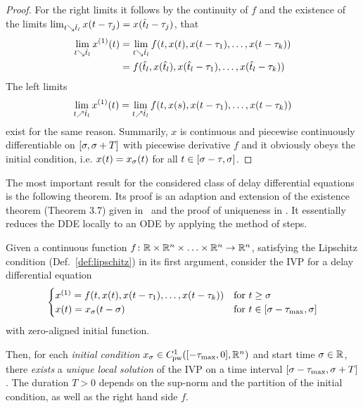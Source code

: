 \begin{proof}
        For the right limits it follows by the continuity of $f$ and the existence of the limits $\lim_{t\searrow\hat{t}_l} x(t-\tau_j) = x(\hat{t}_l-\tau_j)$, that
        \begin{align*}
            \lim_{t\downto\hat{t}_l} \D{x}(t)
            &= \lim_{t\downto\hat{t}_l} f(t,x(t),x(t-\tau_1),\ldots,x(t-\tau_k))\\
            &= f(\hat{t}_l,x(\hat{t}_l),x(\hat{t}_l-\tau_1),\ldots,x(\hat{t}_l-\tau_k))
        \end{align*}
        The left limits
        \begin{equation*}
            \lim_{t\upto\hat{t}_l} \D{x}(t) = \lim_{t\upto\hat{t}_l} f(t,x(s),x(t-\tau_1),\ldots,x(t-\tau_k)) 
        \end{equation*}
        exist for the same reason.
        Summarily, $x$ is continuous and piecewise continuously differentiable on $[\sigma,\sigma+T]$ with piecewise derivative $f$ and it obviously obeys the initial condition, i.e. $x(t)=x_{\sigma}(t)$ for all $t\in[\sigma-\tau,\sigma]$.
    \end{proof}

    The most important result for the considered class of delay differential equations is the following theorem.
    Its proof is an adaption and extension of the existence theorem (Theorem 3.7) given in~\cite{Smith10IntroDDE} and the proof of uniqueness in \cite{PruessWilke10GewDiffGl}. It essentially reduces the DDE locally to an ODE by applying the method of steps.

    \begin{theorem}
        \label{thm:solution-existence}
        Given a continuous function $f\colon\mathbb{R}\times\mathbb{R}^n\times\ldots\times\mathbb{R}^n\to\mathbb{R}^n$, satisfying the Lipschitz condition (Def.~\ref{def:lipschitz}) in its first argument, consider the IVP for a delay differential equation
        \begin{equation}
            \begin{cases}
                \D{x} = f(t,x(t),x(t-\tau_1),\ldots,x(t-\tau_k)) & \text{for } t\geq\tzero\\
                x(t) = x_\tzero(t-\tzero) & \text{for } t\in\compactum{\tzero-\taumax}{\tzero}
            \end{cases}
        \end{equation}
        with zero-aligned initial function.
        

        Then, for each \emph{initial condition} $x_{\tzero}\in\statespace[-\taumax]$ and start time $\sigma\in\mathbb{R}$, there \emph{exists} a \emph{unique local solution} of the IVP on a time interval $[\sigma-\tau_{\max},\sigma+T]$.
        The duration $T>0$ depends on the sup-norm and the partition of the initial condition, as well as the right hand side $f$.
    \end{theorem}

